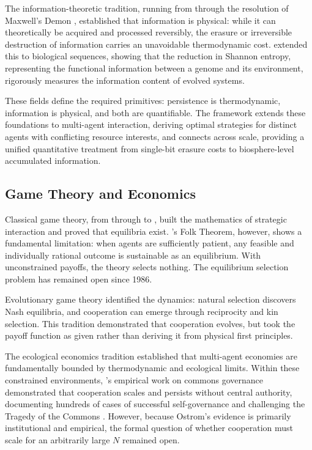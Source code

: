 \documentclass[11pt]{article}
\theoremstyle{plain}
\theoremstyle{definition}
\theoremstyle{remark}
\let\origsubsection\subsection
\renewcommand{\subsection}{\needspace{7\baselineskip}\origsubsection}
\begin{document}
The information-theoretic tradition, running from \citet{Shannon1948}
through the resolution of Maxwell's Demon
\citetext{\citealp{Szilard1929}; \citealp{Landauer1961}; \citealp{Bennett1973}; \citeyear{Bennett1982}},
established that information is physical: while it can theoretically be
acquired and processed reversibly, the erasure or irreversible
destruction of information carries an unavoidable thermodynamic cost.
\citet{Adami2004} extended this to biological sequences, showing that
the reduction in Shannon entropy, representing the functional
information between a genome and its environment, rigorously measures
the information content of evolved systems.

These fields define the required primitives: persistence is
thermodynamic, information is physical, and both are quantifiable. The
framework extends these foundations to multi-agent interaction, deriving
optimal strategies for distinct agents with conflicting resource
interests, and connects across scale, providing a unified quantitative
treatment from single-bit erasure costs to biosphere-level accumulated
information.

\subsection{Game Theory and Economics}\label{game-theory-and-economics}

Classical game theory, from \citet{VonNeumann1944} through
\citeauthor{Nash1950}
\citetext{\citeyear{Nash1950}; \citeyear{Nash1951}} to
\citet{Fudenberg1986}, built the mathematics of strategic interaction
and proved that equilibria exist. \citet{Fudenberg1986}'s Folk Theorem,
however, shows a fundamental limitation: when agents are sufficiently
patient, any feasible and individually rational outcome is sustainable
as an equilibrium. With unconstrained payoffs, the theory selects
nothing. The equilibrium selection problem has remained open since 1986.

Evolutionary game theory
\citep{MaynardSmith1973, Hamilton1964a, Axelrod1984, Weibull1995}
identified the dynamics: natural selection discovers Nash equilibria,
and cooperation can emerge through reciprocity and kin selection. This
tradition demonstrated that cooperation evolves, but took the payoff
function as given rather than deriving it from physical first
principles.

The ecological economics tradition \citep{GeorgescuRoegen1971, Odum1971}
established that multi-agent economies are fundamentally bounded by
thermodynamic and ecological limits. Within these constrained
environments, \citet{Ostrom1990}'s \citeyearpar{Ostrom2005} empirical
work on commons governance demonstrated that cooperation scales and
persists without central authority, documenting hundreds of cases of
successful self-governance and challenging the Tragedy of the Commons
\citep{Hardin1968}. However, because Ostrom's evidence is primarily
institutional and empirical, the formal question of whether cooperation
must scale for an arbitrarily large \(N\) remained open.
\end{document}
